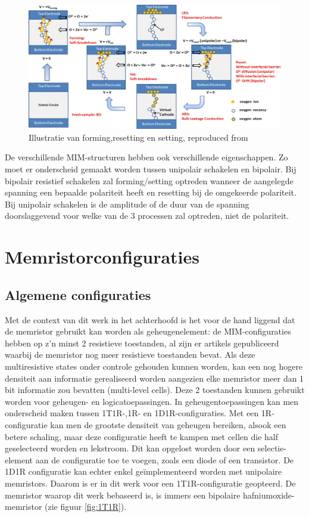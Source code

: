 \begin{figure}
  \centering
  \includegraphics[scale=0.22]{../fig/hfdstk-cel-forming-reset-set.png}
  \caption[Forming,resetting en setting van een memristor]{Illustratie van forming,resetting en setting, reproduced from\cite{Won12}}
  \label{fig:forming-reset-set}
\end{figure}

De verschillende MIM-structuren hebben ook verschillende eigenschappen. Zo moet er onderscheid gemaakt worden tussen unipolair schakelen en bipolair. Bij bipolair resistief schakelen zal forming/setting optreden wanneer de aangelegde spanning een bepaalde polariteit heeft en resetting bij de omgekeerde polariteit. Bij unipolair schakelen is de amplitude of de duur van de spanning doorslaggevend voor welke van de 3 processen zal optreden, niet de polariteit. 


\section{Memristorconfiguraties}

\subsection{Algemene configuraties}
Met de context van dit werk in het achterhoofd is het voor de hand liggend dat de memristor gebruikt kan worden als geheugenelement: de MIM-configuraties hebben op z'n minst 2 resistieve toestanden, al zijn er artikels gepubliceerd waarbij de memristor nog meer resistieve toestanden bevat\cite{Liu12}. Als deze multiresistive states onder controle gehouden kunnen worden, kan een nog hogere densiteit aan informatie gerealiseerd worden aangezien elke memristor meer dan 1 bit informatie zou bevatten (multi-level cells).
Deze 2 toestanden kunnen gebruikt worden voor geheugen- en logicatoepassingen\cite{ros12}\cite{raj09}. In geheugentoepassingen kan men onderscheid maken tussen 1T1R-,1R- en 1D1R-configuraties\cite{Den13}. Met een 1R-configuratie kan men de grootste densiteit van geheugen bereiken, alsook een betere schaling, maar deze configuratie heeft te kampen met cellen die half geselecteerd worden en lekstroom. Dit kan opgelost worden door een selectie-element aan de configuratie toe te voegen, zoals een diode of een transistor. De 1D1R configuratie kan echter enkel geïmplementeerd worden met unipolaire memristors\cite{Wou09}. Daarom is er in dit werk voor een 1T1R-configuratie geopteerd. De memristor waarop dit werk bebaseerd is, is immers een bipolaire hafniumoxide-memristor (zie figuur \ref{fig:1T1R}).

